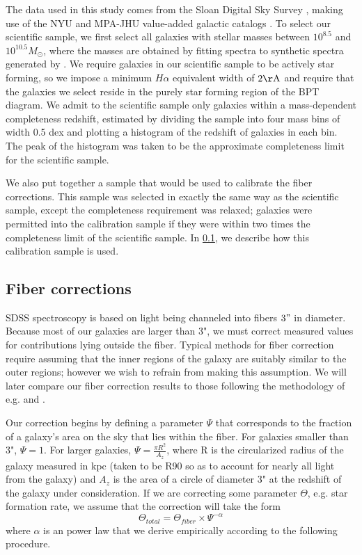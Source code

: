 \documentclass[iop]{emulateapj}
\begin{document}
The data used in this study comes from the Sloan Digital Sky Survey \citep[SDSS,][]{SDSS}, making use of the NYU and MPA-JHU value-added galactic catalogs \citep{Kauffmann03,Brinchmann04,blanton05vagc}. To select our scientific sample, we first select all galaxies with stellar masses between $10^{8.5}$ and $10^{10.5} M_{\odot}$, where the masses are obtained by fitting spectra to synthetic spectra generated by \cite{BC03}. We require galaxies in our scientific sample to be actively star forming, so we impose a minimum $H\alpha$ equivalent width of $2 \rm \AA$ and require that the galaxies we select reside in the purely star forming region of the BPT diagram. We admit to the scientific sample only galaxies within a mass-dependent completeness redshift, estimated by dividing the sample into four mass bins of width 0.5 dex and plotting a histogram of the redshift of galaxies in each bin. The peak of the histogram was taken to be the approximate completeness limit for the scientific sample.

We also put together a sample that would be used to calibrate the fiber corrections. This sample was selected in exactly the same way as the scientific sample, except the completeness requirement was relaxed; galaxies were permitted into the calibration sample if they were within two times the completeness limit of the scientific sample. In \ref{sec:fibercor}, we describe how this calibration sample is used.

\subsection{Fiber corrections}
\label{sec:fibercor}
SDSS spectroscopy is based on light being channeled into fibers $3"$ in diameter. Because most of our galaxies are larger than 3", we must correct measured values for contributions lying outside the fiber. Typical methods for fiber correction require assuming that the inner regions of the galaxy are suitably similar to the outer regions; however we wish to refrain from making this assumption. We will later compare our fiber correction results to those following the methodology of e.g. \cite{Brinchmann04} and \cite{Salim07}.

Our correction begins by defining a parameter $\Psi$ that corresponds to the fraction of a galaxy's area on the sky that lies within the fiber. For galaxies smaller than 3", $\Psi = 1$. For larger galaxies, $\Psi = \frac{\pi R^2}{A_z}$, where R is the circularized radius of the galaxy measured in kpc (taken to be R90 so as to account for nearly all light from the galaxy) and $A_z$ is the area of a circle of diameter 3" at the redshift of the galaxy under consideration. If we are correcting some parameter $\Theta$, e.g. star formation rate, we assume that the correction will take the form $$\Theta_{total} = \Theta_{fiber} \times \Psi^{-\alpha}$$ where $\alpha$ is an power law that we derive empirically according to the following procedure.
\end{document}
